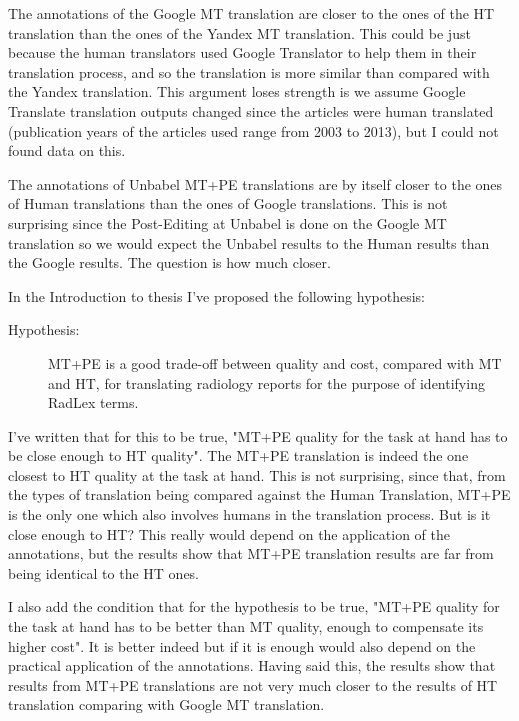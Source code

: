 The annotations of the Google MT translation are closer to the ones of the HT translation than the ones of the Yandex MT translation. This could be just because the human translators used Google Translator to help them in their translation process, and so the translation is more similar than compared with the Yandex translation. This argument loses strength is we assume Google Translate translation outputs changed since the articles were human translated (publication years of the articles used range from 2003 to 2013), but I could not found data on this. 

The annotations of Unbabel MT+PE translations are by itself closer to the ones of Human translations than the ones of Google translations. This is not surprising since the Post-Editing at Unbabel is done on the Google MT translation so we would expect the Unbabel results to the Human results than the Google results. The question is how much closer. 

In the Introduction to thesis I've proposed the following hypothesis:

\begin{description}
	\item[Hypothesis:] MT+PE is a good trade-off between quality and cost, compared with MT and HT, for translating radiology reports for the purpose of identifying RadLex terms. 
\end{description}


I've written that for this to be true, "MT+PE quality for the task at hand has to be close enough to HT quality". The MT+PE translation is indeed the one closest to HT quality at the task at hand. This is not surprising, since that, from the types of translation being compared against the Human Translation, MT+PE is the only one which also involves humans in the translation process. But is it close enough to HT? This really would depend on the application of the annotations, but the results show that MT+PE translation results are far from being identical to the HT ones.  

I also add the condition that for the hypothesis to be true, "MT+PE quality for the task at hand has to be better than MT quality, enough to compensate its higher cost". It is better indeed but if it is enough would also depend on the practical application of the annotations. Having said this, the results show that results from MT+PE translations are not very much closer to the results of HT translation comparing with Google MT translation. 

